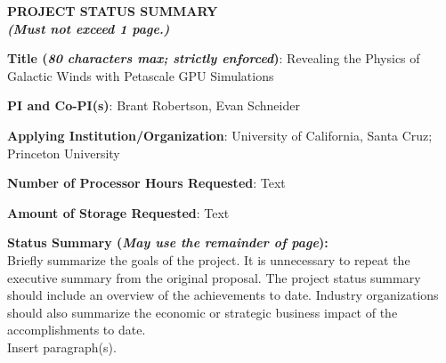 \documentclass[11pt,letterpaper,english]{article}
\begin{document}
\setlength{\parindent}{0in} %

\pagestyle{fancy}   \renewcommand{%
\headrulewidth}{0.0pt}

\begin{center}
\bf \large {PROJECT STATUS SUMMARY} \\
{\bf \small {\em (Must not exceed 1 page.)}}
\end{center}



\textbf{Title (\emph{80 characters max; strictly enforced})}: Revealing the Physics of Galactic Winds with Petascale GPU Simulations \smallskip

\textbf{PI and Co-PI(s)}: Brant Robertson, Evan Schneider \smallskip

\textbf{Applying Institution/Organization}: University of California, Santa Cruz; Princeton University \smallskip

\textbf{Number of Processor Hours Requested}: Text \smallskip

\textbf{Amount of Storage Requested}: Text \smallskip

\textbf{Status Summary ({\emph{May use the remainder of page}}):} \\

Briefly summarize the goals of the project. It is unnecessary to repeat the executive summary from the original proposal. The project status summary should include an overview of the achievements to date. Industry organizations should also summarize the economic or strategic business impact of the accomplishments to date.\\
\vspace{.15in}
Insert paragraph(s). 

\end{document}
